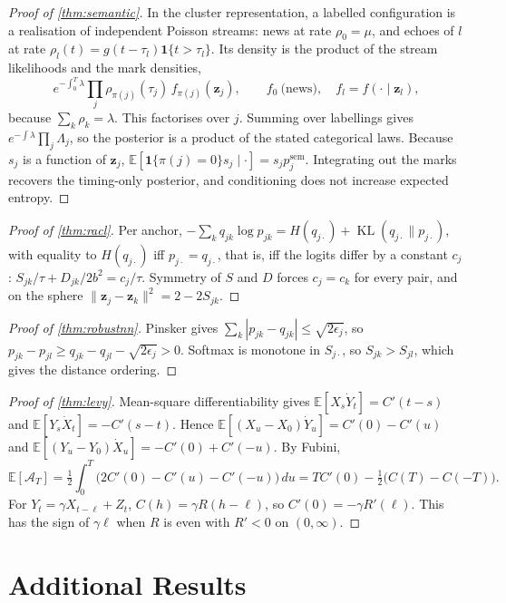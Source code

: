 \documentclass[10pt,twocolumn,letterpaper]{article}
\theoremstyle{plain}
\theoremstyle{definition}
\theoremstyle{remark}
\newcommand{\E}{\mathbb{E}}
\newcommand{\z}{\bm{z}}
\newcommand{\ind}{\mathbf{1}}
\DeclareMathOperator{\KL}{KL}
\begin{document}
\begin{proof}[Proof of \cref{thm:semantic}]
In the cluster representation, a labelled configuration is a realisation of independent Poisson streams: news at rate $\rho_0=\mu$, and echoes of $l$ at rate $\rho_l(t)=g(t-\tau_l)\ind\{t>\tau_l\}$. Its density is the product of the stream likelihoods and the mark densities,
\[
  e^{-\int_0^T\lambda}\prod_{j}\rho_{\pi(j)}(\tau_j)\,f_{\pi(j)}(\z_j),\qquad f_0\ \text{(news)},\quad f_l=f(\cdot\mid\z_l),
\]
because $\sum_k\rho_k=\lambda$. This factorises over $j$. Summing over labellings gives $e^{-\int\lambda}\prod_j\Lambda_j$, so the posterior is a product of the stated categorical laws. Because $s_j$ is a function of $\z_j$, $\E[\ind\{\pi(j)=0\}s_j\mid\cdot]=s_jp^{\mathrm{sem}}_j$. Integrating out the marks recovers the timing-only posterior, and conditioning does not increase expected entropy.
\end{proof}

\begin{proof}[Proof of \cref{thm:racl}]
Per anchor, $-\sum_kq_{jk}\log p_{jk}=H(q_{j\cdot})+\KL(q_{j\cdot}\|p_{j\cdot})$, with equality to $H(q_{j\cdot})$ iff $p_{j\cdot}=q_{j\cdot}$, that is, iff the logits differ by a constant $c_j$: $S_{jk}/\tau+D_{jk}/2b^2=c_j/\tau$. Symmetry of $S$ and $D$ forces $c_j=c_k$ for every pair, and on the sphere $\|\z_j-\z_k\|^2=2-2S_{jk}$.
\end{proof}

\begin{proof}[Proof of \cref{thm:robustnn}]
Pinsker gives $\sum_k|p_{jk}-q_{jk}|\le\sqrt{2\epsilon_j}$, so $p_{jk}-p_{jl}\ge q_{jk}-q_{jl}-\sqrt{2\epsilon_j}>0$. Softmax is monotone in $S_{j\cdot}$, so $S_{jk}>S_{jl}$, which gives the distance ordering.
\end{proof}

\begin{proof}[Proof of \cref{thm:levy}]
Mean-square differentiability gives $\E[X_s\dot Y_t]=C'(t-s)$ and $\E[Y_s\dot X_t]=-C'(s-t)$. Hence $\E[(X_u-X_0)\dot Y_u]=C'(0)-C'(u)$ and $\E[(Y_u-Y_0)\dot X_u]=-C'(0)+C'(-u)$. By Fubini,
\[
  \E[\mathcal{A}_T]=\tfrac12\int_0^T\big(2C'(0)-C'(u)-C'(-u)\big)\,du=TC'(0)-\tfrac12\big(C(T)-C(-T)\big).
\]
For $Y_t=\gamma X_{t-\ell}+Z_t$, $C(h)=\gamma R(h-\ell)$, so $C'(0)=-\gamma R'(\ell)$. This has the sign of $\gamma\ell$ when $R$ is even with $R'<0$ on $(0,\infty)$.
\end{proof}

\section{Additional Results}\label{app:extra}
\end{document}
